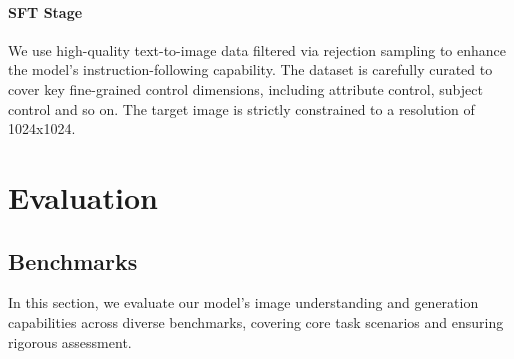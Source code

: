 \documentclass[11pt, a4paper, logo, copyright]{googledeepmind}
\begin{document}
\paragraph{SFT Stage} We use high-quality text-to-image data filtered via rejection sampling to enhance the model’s instruction-following capability. The dataset is carefully curated to cover key fine-grained control dimensions, including attribute control, subject control and so on. The target image is strictly constrained to a resolution of 1024x1024.







\section{Evaluation}

\subsection{Benchmarks}
In this section, we evaluate our model’s image understanding and generation capabilities across diverse benchmarks, covering core task scenarios and ensuring rigorous assessment.
\end{document}

